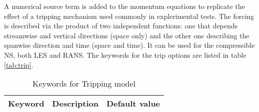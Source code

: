\documentclass[a4paper,10pt]{report}
\begin{document}
A numerical source term is added to the momentum equations to replicate the effect of a tripping mechanism used commonly in explerimental tests. The forcing is described via the product of two independent functions: one that depends streamwise and vertical directions (space only) and the other one describing the spanwise direction and time (space and time).
It can be used for the compressible NS, both LES and RANS.
The keywords for the trip options are listed in table \ref{tab:trip}.

\begin{table}[htbp]
\caption{Keywords for Tripping model}
\begin{tabular}{|l|p{10cm}|p{2.2cm}|}
\hline
\multicolumn{1}{|c|}{Keyword} & \multicolumn{1}{c|}{Description} & \multicolumn{1}{c|}{Default value} \\ \hline


\end{tabular}
\end{table}
\end{document}
